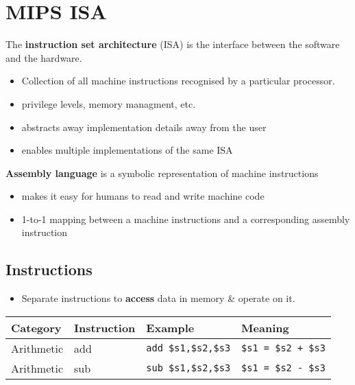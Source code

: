 \documentclass{article}
\newcommand{\T}[1]{\texttt{#1}}
\begin{document}
\section{MIPS ISA}
\begin{definition}
	The \textbf{instruction set architecture} (ISA) is the interface between
	the software and the hardware.
	\begin{itemize}
		\item Collection of all machine instructions recognised by
					a particular processor.
		\item privilege levels, memory managment, etc.
		\item abstracts away implementation details away from the user
		\item enables multiple implementations of the same ISA
	\end{itemize}
\end{definition}
\begin{definition}
	\textbf{Assembly language} is a symbolic representation of machine instructions
	\begin{itemize}
		\item makes it easy for humans to read and write machine code
		\item 1-to-1 mapping between a machine instructions and a corresponding
			    assembly instruction
	\end{itemize}
\end{definition}
\subsection{Instructions}
\begin{itemize}
	\item Separate instructions to \textbf{access} data in memory \& operate on it.
\end{itemize}

\begin{tabular}{| l | l | l | l |}
	\hline
	Category & Instruction & Example & Meaning	\\
	\hline
	\hline
	Arithmetic & add & \T{add \$s1,\$s2,\$s3} & \T{\$s1 = \$s2 + \$s3} \\
	\hline
	Arithmetic & sub & \T{sub \$s1,\$s2,\$s3} & \T{\$s1 = \$s2 - \$s3} \\
	\hline
\end{tabular}
\end{document}
